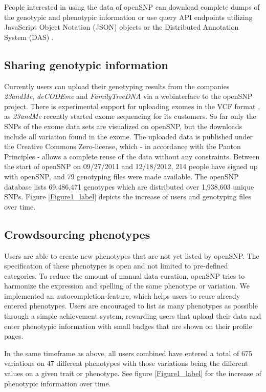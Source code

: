 \documentclass[10pt]{article}
\newcommand{\bastian}[1]{\authornote{BG: #1}}
\begin{document}
People interested in using the data of openSNP can download complete dumps of the genotypic and phenotypic information or use query API endpoints utilizing JavaScript Object Notation (JSON) objects or the Distributed Annotation System (DAS) \cite{Dowell2001}. 


\subsection*{Sharing genotypic information}
Currently users can upload their genotyping results from the companies \textit{23andMe}, \textit{deCODEme }and \textit{FamilyTreeDNA} via a webinterface to the openSNP 
project. There is experimental support for uploading exomes in the VCF format \cite{Danecek01082011}, as \textit{23andMe} recently started exome sequencing for its customers. So far only the SNPs of the exome data sets are visualized on openSNP, but the downloads include all variation found in the exome.
The uploaded data is published under the Creative Commons Zero-license, 
which - in accordance with the Panton Principles \cite{10.1371/journal.pbio.1001195} - 
allows a complete reuse of the data without any constraints.
Between the start of openSNP on 09/27/2011 and 12/18/2012, 214 people have signed 
up with openSNP, and 79 genotyping files were made available. The openSNP 
database lists 69,486,471 genotypes which are distributed over 1,938,603 unique SNPs.
Figure \ref{Figure1_label} depicts the increase of users and genotyping files over time.\bastian{update all numbers}


\subsection*{Crowdsourcing phenotypes}
Users are able to create new phenotypes that are not yet 
listed by openSNP. 
The specification of these phenotypes is open and not limited 
to pre-defined categories. To reduce the amount of manual data curation, openSNP tries to harmonize 
the expression and spelling of the same phenotype or variation. We implemented an 
autocompletion-feature, which helps users to reuse already entered phenotypes.
Users are encouraged to list as many phenotypes as possible through a simple 
achievement system, rewarding users that upload their data and enter phenotypic 
information with small badges that are shown on their profile pages.

In the same timeframe as above, all users combined have 
entered a total of 675 variations on 47 different phenotypes with those variations being 
the different values on a given trait or phenotype. See figure \ref{Figure1_label} for the increase of phenotypic information over time.
\end{document}
